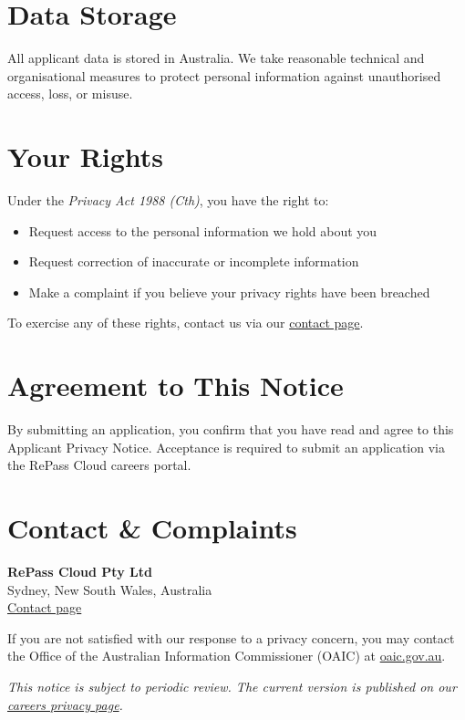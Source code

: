 \documentclass[11pt]{article}
\begin{document}
\section{Data Storage}

All applicant data is stored in Australia. We take reasonable technical and organisational measures to protect personal information against unauthorised access, loss, or misuse.

\section{Your Rights}

Under the \textit{Privacy Act 1988 (Cth)}, you have the right to:

\begin{itemize}
\item Request access to the personal information we hold about you
\item Request correction of inaccurate or incomplete information
\item Make a complaint if you believe your privacy rights have been breached
\end{itemize}

To exercise any of these rights, contact us via our \href{https://repasscloud.com/contact/}{contact page}.

\section{Agreement to This Notice}

By submitting an application, you confirm that you have read and agree to this Applicant Privacy Notice. Acceptance is required to submit an application via the RePass Cloud careers portal.

\section{Contact \& Complaints}

\textbf{RePass Cloud Pty Ltd} \\
Sydney, New South Wales, Australia \\
\href{https://repasscloud.com/contact/}{Contact page}

If you are not satisfied with our response to a privacy concern, you may contact the Office of the Australian Information Commissioner (OAIC) at \href{https://www.oaic.gov.au}{oaic.gov.au}.

\textit{This notice is subject to periodic review. The current version is published on our \href{https://repasscloud.com/careers/privacy/}{careers privacy page}.}
\end{document}
